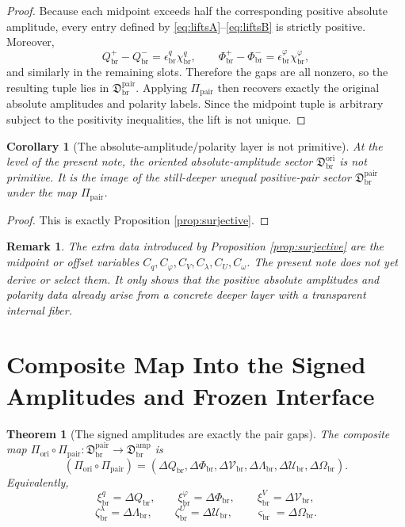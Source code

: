 \documentclass[11pt]{article}
\newcommand{\LiftSector}{\mathfrak D_{\mathrm{br}}^{\mathrm{amp}}}
\newcommand{\DeepReadAmp}{\xi_{\mathrm{br}}^{q}}
\newcommand{\DeepCovAmp}{\xi_{\mathrm{br}}^{\varphi}}
\newcommand{\DeepRelaxAmp}{\xi_{\mathrm{br}}^{V}}
\newcommand{\DeepWellAmp}{\zeta_{\mathrm{br}}^{\lambda}}
\newcommand{\DeepEqAmp}{\zeta_{\mathrm{br}}^{U}}
\newcommand{\DeepScaleAmp}{\varsigma_{\mathrm{br}}}
\newcommand{\OriginSector}{\mathfrak D_{\mathrm{br}}^{\mathrm{ori}}}
\newcommand{\AbsReadAmp}{\chi_{\mathrm{br}}^{q}}
\newcommand{\AbsCovAmp}{\chi_{\mathrm{br}}^{\varphi}}
\newcommand{\PolRead}{\epsilon_{\mathrm{br}}^{q}}
\newcommand{\PolCov}{\epsilon_{\mathrm{br}}^{\varphi}}
\newcommand{\OriginMap}{\Pi_{\mathrm{ori}}}
\newcommand{\PairSector}{\mathfrak D_{\mathrm{br}}^{\mathrm{pair}}}
\newcommand{\PairMap}{\Pi_{\mathrm{pair}}}
\newcommand{\PairReadPlus}{Q_{\mathrm{br}}^{+}}
\newcommand{\PairReadMinus}{Q_{\mathrm{br}}^{-}}
\newcommand{\PairCovPlus}{\Phi_{\mathrm{br}}^{+}}
\newcommand{\PairCovMinus}{\Phi_{\mathrm{br}}^{-}}
\newcommand{\GapRead}{\Delta Q_{\mathrm{br}}}
\newcommand{\GapCov}{\Delta \Phi_{\mathrm{br}}}
\newcommand{\GapRelax}{\Delta \mathcal V_{\mathrm{br}}}
\newcommand{\GapWell}{\Delta \Lambda_{\mathrm{br}}}
\newcommand{\GapEq}{\Delta \mathcal U_{\mathrm{br}}}
\newcommand{\GapScale}{\Delta \Omega_{\mathrm{br}}}
\newtheorem{remark}{Remark}
\newtheorem{corollary}{Corollary}
\newtheorem{theorem}{Theorem}
\begin{document}
\begin{proof}
Because each midpoint exceeds half the corresponding positive absolute amplitude, every entry defined by \eqref{eq:liftsA}--\eqref{eq:liftsB} is strictly positive. Moreover,
\[
\PairReadPlus-\PairReadMinus=\PolRead\AbsReadAmp,
\qquad
\PairCovPlus-\PairCovMinus=\PolCov\AbsCovAmp,
\]
and similarly in the remaining slots. Therefore the gaps are all nonzero, so the resulting tuple lies in \(\PairSector\). Applying \(\PairMap\) then recovers exactly the original absolute amplitudes and polarity labels. Since the midpoint tuple is arbitrary subject to the positivity inequalities, the lift is not unique.
\end{proof}

\begin{corollary}[The absolute-amplitude/polarity layer is not primitive]
\label{cor:notprimitive}
At the level of the present note, the oriented absolute-amplitude sector \(\OriginSector\) is not primitive. It is the image of the still-deeper unequal positive-pair sector \(\PairSector\) under the map \(\PairMap\).
\end{corollary}

\begin{proof}
This is exactly Proposition \ref{prop:surjective}.
\end{proof}

\begin{remark}
The extra data introduced by Proposition \ref{prop:surjective} are the midpoint or offset variables \(C_{q},C_{\varphi},C_{V},C_{\lambda},C_{U},C_{\omega}\). The present note does not yet derive or select them. It only shows that the positive absolute amplitudes and polarity data already arise from a concrete deeper layer with a transparent internal fiber.
\end{remark}

\section{Composite Map Into the Signed Amplitudes and Frozen Interface}

\begin{theorem}[The signed amplitudes are exactly the pair gaps]
\label{thm:signed}
The composite map \(\OriginMap\circ\PairMap:\PairSector\to\LiftSector\) is
\begin{equation}
(\OriginMap\circ\PairMap)
=
(\GapRead,\GapCov,\GapRelax,\GapWell,\GapEq,\GapScale).
\label{eq:signedgaps}
\end{equation}
Equivalently,
\begin{equation}
\DeepReadAmp=\GapRead,
\qquad
\DeepCovAmp=\GapCov,
\qquad
\DeepRelaxAmp=\GapRelax,
\label{eq:deepgapsA}
\end{equation}
\begin{equation}
\DeepWellAmp=\GapWell,
\qquad
\DeepEqAmp=\GapEq,
\qquad
\DeepScaleAmp=\GapScale.
\label{eq:deepgapsB}
\end{equation}
\end{theorem}
\end{document}
